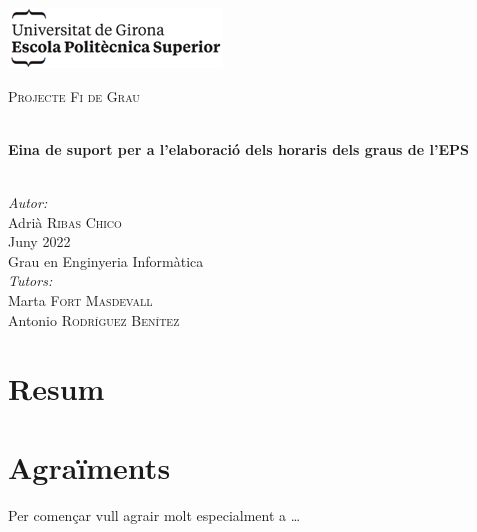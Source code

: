 \documentclass[a4paper,12pt,twoside]{ThesisStyle}
\begin{document}
\begin{titlepage}

\includegraphics[scale=0.9]{imatges/logo_eps.png} \\[1cm]
\begin{center}
\textsc{\Large Projecte Fi de Grau} \\[1cm]

\begin{spacing}{2}
\HRule \\
\textbf{\Huge Eina de suport per a l’elaboració dels horaris dels graus de l’EPS} \\
\HRule \\[0.5cm]
\end{spacing}

{
\large
\emph{Autor:} \\
Adrià \textsc{Ribas Chico} \\[1cm]
Juny 2022 \\[1cm]
Grau en Enginyeria Informàtica \\[1cm]
\emph{Tutors:} \\
Marta \textsc{Fort Masdevall} \\
Antonio \textsc{Rodríguez Benítez} \\
}

\end{center}
\end{titlepage}

\titlepage

\dominitoc


\chapter*{Resum}
\label{cap:resum}



\chapter*{Agraïments}
\label{cap:agraiments}

Per començar vull agrair molt especialment a \ldots


\tableofcontents

\end{document}
